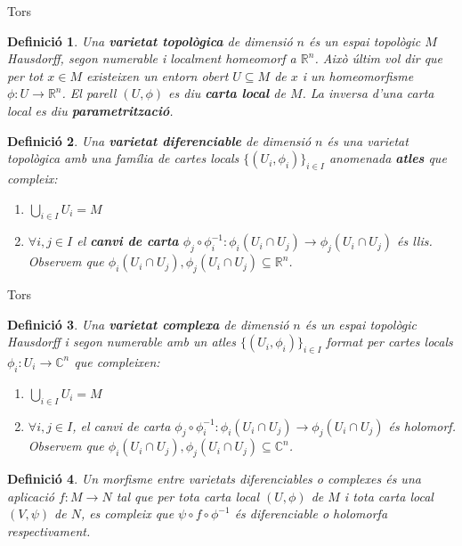 \documentclass{beamer}
\newtheorem{definicio}{Definici\'{o}}
\theoremstyle{definition}
\begin{document}
\begin{frame}{Tors}
\begin{definicio}
Una \textbf{varietat topol\`{o}gica} de dimensi\'{o} $n$ \'{e}s un espai topol\`{o}gic $M$ Hausdorff, segon numerable i localment homeomorf a $\mathbb{R}^n$. Aix\`{o} \'{u}ltim vol dir que per tot $x\in M$ existeixen un entorn obert $U\subseteq M$ de $x$ i un homeomorfisme $\phi:U\rightarrow\mathbb{R}^n$. El parell $(U,\phi)$ es diu \textbf{carta local} de $M$. La inversa d'una carta local es diu \textbf{parametritzaci\'{o}}.
\end{definicio}
\pause
\begin{definicio}
Una \textbf{varietat diferenciable} de dimensi\'{o} $n$ \'{e}s una varietat topol\`{o}gica amb una fam\'{i}lia de cartes locals $\{(U_i,\phi_i)\}_{i\in I}$ anomenada \textbf{atles} que compleix:
\begin{enumerate}
\item $\displaystyle{\bigcup_{i\in I}U_i=M}$
\item $\forall i,j\in I$ el \textbf{canvi de carta} $\phi_j\circ\phi_i^{-1}:\phi_i(U_i\cap U_j)\rightarrow\phi_j(U_i\cap U_j)$ \'{e}s llis. Observem que $\phi_i(U_i\cap U_j),\phi_j(U_i\cap U_j)\subseteq\mathbb{R}^n$.
\end{enumerate}
\end{definicio}
\end{frame}

\begin{frame}{Tors}
\begin{definicio}
Una \textbf{varietat complexa} de dimensi\'{o} $n$ \'{e}s un espai topol\`{o}gic Hausdorff i segon numerable amb un atles $\{(U_i,\phi_i)\}_{i\in I}$ format per cartes locals $\phi_i:U_i\rightarrow\mathbb{C}^n$ que compleixen:
\begin{enumerate}
\item $\displaystyle{\bigcup_{i\in I}U_i=M}$
\item $\forall i,j\in I$, el canvi de carta $\phi_j\circ\phi_i^{-1}:\phi_i(U_i\cap U_j)\rightarrow\phi_j(U_i\cap U_j)$ \'{e}s holomorf. Observem que $\phi_i(U_i\cap U_j),\phi_j(U_i\cap U_j)\subseteq\mathbb{C}^n$.
\end{enumerate}
\end{definicio}
\pause
\begin{definicio}
Un morfisme entre varietats diferenciables o complexes \'{e}s una aplicaci\'{o} $f:M\rightarrow N$ tal que per tota carta local $(U,\phi)$ de $M$ i tota carta local $(V,\psi)$ de $N$, es compleix que $\psi\circ f\circ\phi^{-1}$ \'{e}s diferenciable o holomorfa respectivament.
\end{definicio}
\end{frame}
\end{document}

